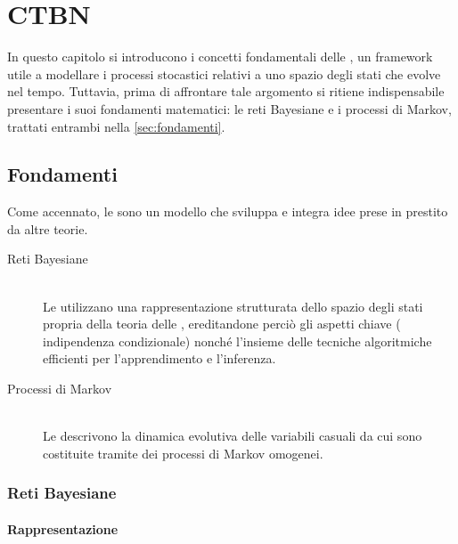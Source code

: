 
\chapter{CTBN}
\label{cap:ctbn}

In questo capitolo si introducono i concetti fondamentali delle \ctbn{}, un framework utile a modellare i processi stocastici relativi a uno spazio degli stati che evolve nel tempo.
Tuttavia, prima di affrontare tale argomento si ritiene indispensabile presentare i suoi fondamenti matematici: le reti Bayesiane e i processi di Markov, trattati entrambi nella \autoref{sec:fondamenti}.

\section{Fondamenti}
\label{sec:fondamenti}

Come accennato, le \ctbn{} sono un modello che sviluppa e integra idee prese in prestito da altre teorie.
\begin{description}
\item[Reti Bayesiane] \hfill \\
Le \ctbn{} utilizzano una rappresentazione strutturata dello spazio degli stati propria della teoria delle \bns{}, ereditandone perciò gli aspetti chiave (\ie{} indipendenza condizionale) nonché l'insieme delle tecniche algoritmiche efficienti per l'apprendimento e l'inferenza.
\item[Processi di Markov] \hfill \\
Le \ctbn{} descrivono la dinamica evolutiva delle variabili casuali da cui sono costituite tramite dei processi di Markov omogenei.
\end{description} 

\subsection{Reti Bayesiane}
\label{sec:bns}

\subsubsection{Rappresentazione}

\begin{definizione}
\end{definizione} 

